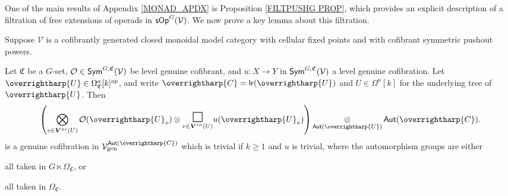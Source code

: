 \documentclass[a4paper,10pt
,draft
]{article}%
\renewcommand{\1}{\eta}%
\newcommand{\OC}{\Omega_{\mathfrak C}}
\newcommand{\vect}[1]{\text{\overrightharp{\ensuremath{#1}}}}
\begin{document}
One of the main results of Appendix \ref{MONAD_APDX} is Proposition \ref{FILTPUSHG PROP},
which provides an explicit description of a filtration of free extensions of operads in $\mathsf{sOp}^G(\mathcal V)$.
We now prove a key lemma about this filtration.
\begin{lemma} %
      \label{EXMAINLEM LEM}
      Suppose $\mathcal{V}$ is a cofibrantly generated closed monoidal model category
      with cellular fixed points and
      with cofibrant symmetric pushout powers.

      Let $\mathfrak C$ be a $G$-set,
      $\mathcal{O} \in \mathsf{Sym}^{G,\mathfrak C}(\mathcal{V})$
      be level genuine cofibrant,
      and  
      $u: X \to Y$ in $\mathsf{Sym}^{G, \mathfrak C}(\mathcal V)$ a level genuine cofibration. 
      Let $\vect U \in \Omega_{\mathfrak C}^a[k]^{op}$, and write $\vect C = \mathsf{lr}(\vect U)$ and $U \in \Omega^a[k]$ for the underlying tree of $\vect U$.
      Then
      \begin{equation}\label{EXMAINLEM EQ}
            \left(
                  \bigotimes\limits_{v \in \boldsymbol{V}^{ac}(U)}\O(\vect U_v) \otimes
                  \underset{v \in \boldsymbol{V}^{in}(U)}
                  {\mathlarger{\mathlarger{\mathlarger{\square}}}}
                  u(\vect U_v)
            \right) 
            \mathop{\otimes}\limits_{\mathsf{Aut}({\vect U})} \mathsf{Aut}(\vect C).
      \end{equation}
      is a genuine cofibration in 
      $\mathcal{V}^{\mathsf{Aut}(\vect C)}_{\text{gen}}$ which is trivial if $k \geq 1$ and $u$ is trivial,
      where the automorphism groups are either
      \begin{inparaenum}[(i)]
      \item all taken in $G \ltimes \OC$, or
      \item all taken in $\Omega_{\mathfrak C}$.
      \end{inparaenum}
\end{lemma}
\end{document}
